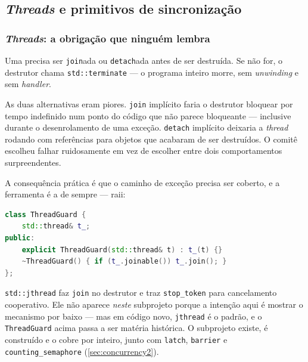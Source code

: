 \subsection{\emph{Threads} e primitivos de sincronização}
\label{sec:concurrency}

\subsubsection{\emph{Threads}: a obrigação que ninguém lembra}

Uma  precisa ser \texttt{join}ada ou \texttt{detach}ada
antes de ser destruída. Se não for, o destrutor chama
\texttt{std::terminate} --- o programa inteiro morre, sem \emph{unwinding} e sem
\emph{handler}.

\begin{porque}
As duas alternativas eram piores. \texttt{join} implícito faria o destrutor
bloquear por tempo indefinido num ponto do código que não parece bloqueante ---
inclusive durante o desenrolamento de uma exceção. \texttt{detach} implícito
deixaria a \emph{thread} rodando com referências para objetos que acabaram de
ser destruídos. O comitê escolheu falhar ruidosamente em vez de escolher entre
dois comportamentos surpreendentes.
\end{porque}

A consequência prática é que o caminho de exceção precisa ser coberto, e a
ferramenta é a de sempre --- \gls{raii}:

\begin{lstlisting}[style=bt, language=C++,
    caption={O \emph{guard} que garante o \texttt{join} mesmo com exceção.}]
class ThreadGuard {
    std::thread& t_;
public:
    explicit ThreadGuard(std::thread& t) : t_(t) {}
    ~ThreadGuard() { if (t_.joinable()) t_.join(); }
};
\end{lstlisting}

\begin{regra}
\texttt{std::jthread} faz \texttt{join} no destrutor e traz \texttt{stop\_token}
para cancelamento cooperativo. Ele não aparece \emph{neste} subprojeto porque a
intenção aqui é mostrar o mecanismo por baixo --- mas em código novo,
\texttt{jthread} é o padrão, e o \texttt{ThreadGuard} acima passa a ser matéria
histórica. O subprojeto  existe, é construído e o cobre
por inteiro, junto com \texttt{latch}, \texttt{barrier} e
\texttt{counting\_semaphore} (\cref{sec:concurrency2}).
\end{regra}


